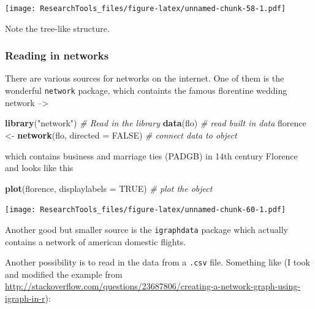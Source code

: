 \documentclass[]{article}
\newenvironment{Shaded}{\begin{snugshade}}{\end{snugshade}}
\newcommand{\KeywordTok}[1]{\textcolor[rgb]{0.13,0.29,0.53}{\textbf{{#1}}}}
\newcommand{\DataTypeTok}[1]{\textcolor[rgb]{0.13,0.29,0.53}{{#1}}}
\newcommand{\StringTok}[1]{\textcolor[rgb]{0.31,0.60,0.02}{{#1}}}
\newcommand{\CommentTok}[1]{\textcolor[rgb]{0.56,0.35,0.01}{\textit{{#1}}}}
\newcommand{\OtherTok}[1]{\textcolor[rgb]{0.56,0.35,0.01}{{#1}}}
\newcommand{\NormalTok}[1]{{#1}}
\theoremstyle{definition}
\theoremstyle{definition}
\theoremstyle{definition}
\theoremstyle{remark}
\begin{document}
\texttt{[image: ResearchTools\_files/figure-latex/unnamed-chunk-58-1.pdf]}

Note the tree-like structure.

\subsubsection{Reading in networks}\label{reading-in-networks}

There are various sources for networks on the internet. One of them is
the wonderful \texttt{network} package, which containts the famous
florentine wedding network --\textgreater{}

\begin{Shaded}
\begin{Highlighting}[]
\KeywordTok{library}\NormalTok{(}\StringTok{"network"}\NormalTok{)                 }\CommentTok{# Read in the library}
\KeywordTok{data}\NormalTok{(flo)                          }\CommentTok{# read built in data}
\NormalTok{florence <-}\StringTok{ }\KeywordTok{network}\NormalTok{(flo, }\DataTypeTok{directed =} \OtherTok{FALSE}\NormalTok{) }\CommentTok{# connect data to object}
\end{Highlighting}
\end{Shaded}

which contains business and marriage ties (PADGB) in 14th century
Florence and looks like this

\begin{Shaded}
\begin{Highlighting}[]
\KeywordTok{plot}\NormalTok{(florence, }\DataTypeTok{displaylabels =} \OtherTok{TRUE}\NormalTok{) }\CommentTok{# plot the object}
\end{Highlighting}
\end{Shaded}

\texttt{[image: ResearchTools\_files/figure-latex/unnamed-chunk-60-1.pdf]}

Another good but smaller source is the \texttt{igraphdata} package which
actually contains a network of american domestic flights.

Another possibility is to read in the data from a \texttt{.csv} file.
Something like (I took and modified the example from
\url{http://stackoverflow.com/questions/23687806/creating-a-network-graph-using-igraph-in-r}):
\end{document}
